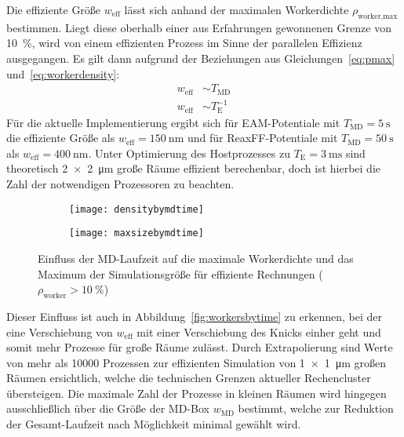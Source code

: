 Die effiziente Größe $w_\text{eff}$ lässt sich anhand der maximalen Workerdichte $\rho_\text{worker,max}$ bestimmen.
Liegt diese oberhalb einer aus Erfahrungen gewonnenen Grenze von \SI{10}{\percent}, wird von einem effizienten Prozess im Sinne der parallelen Effizienz ausgegangen.
Es gilt dann aufgrund der Beziehungen aus Gleichungen~\ref{eq:pmax} und~\ref{eq:workerdensity}:%
\begin{align}
  w_\text{eff} & \sim T_\text{MD}     \\
  w_\text{eff} & \sim T_\text{E}^{-1}
\end{align}
Für die aktuelle Implementierung ergibt sich für EAM-Potentiale mit $T_\text{MD}=\SI{5}{\second}$ die effiziente Größe als $w_\text{eff} = \SI{150}{\nano\meter}$ und für ReaxFF-Potentiale mit $T_\text{MD}=\SI{50}{\second}$ als $w_\text{eff} = \SI{400}{\nano\meter}$.
Unter Optimierung des Hostprozesses zu $T_\text{E} = \SI{3}{\milli\second}$ sind theoretisch \SI{2x2}{\micro\meter} große Räume effizient berechenbar, doch ist hierbei die Zahl der notwendigen Prozessoren zu beachten.

\begin{figure}[p]
  \captionsetup[subfigure]{singlelinecheck=false}
  \def\subfigwidth{7cm}
  \begin{subfigure}[t]{\subfigwidth}
    \texttt{[image: densitybymdtime]}
  \end{subfigure}
  \hfill
  \begin{subfigure}[t]{\subfigwidth}
    \texttt{[image: maxsizebymdtime]}
  \end{subfigure}

  \caption[$\rho_\text{worker}$ und $w_\text{eff}$ in Abhängigkeit von $T_\text{MD}$]{Einfluss der MD-Laufzeit auf die maximale Workerdichte und das Maximum der Simulationsgröße für effiziente Rechnungen ($\rho_\text{worker} > \SI{10}{\percent}$)}
  \label{fig:densitymaxsize}

\end{figure}

Dieser Einfluss ist auch in Abbildung~\ref{fig:workersbytime} zu erkennen, bei der eine Verschiebung von $w_\text{eff}$ mit einer Verschiebung des Knicks einher geht und somit mehr Prozesse für große Räume zulässt.
Durch Extrapolierung sind Werte von mehr als \num{10000} Prozessen zur effizienten Simulation von \SI{1x1}{\micro\meter} großen Räumen ersichtlich, welche die technischen Grenzen aktueller Rechencluster übersteigen.
Die maximale Zahl der Prozesse in kleinen Räumen wird hingegen ausschließlich über die Größe der MD-Box $w_\text{MD}$ bestimmt, welche zur Reduktion der Gesamt-Laufzeit nach Möglichkeit minimal gewählt wird.

